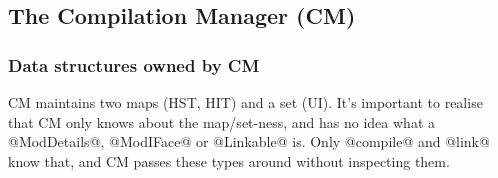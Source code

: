 \documentclass[11pt]{article}
\begin{document}
\subsection{The Compilation Manager (CM)}
\label{sec:manager}

\subsubsection{Data structures owned by CM}

CM maintains two maps (HST, HIT) and a set (UI).  It's important to
realise that CM only knows about the map/set-ness, and has no idea
what a @ModDetails@, @ModIFace@ or @Linkable@ is.  Only @compile@ and
@link@ know that, and CM passes these types around without
inspecting them.
\end{document}
